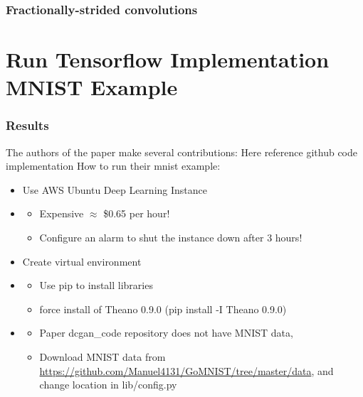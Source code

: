 \documentclass{beamer}
\begin{document}

\begin{frame}
\frametitle{Fractionally-strided convolutions}

\end{frame}



\section{Run Tensorflow Implementation MNIST Example}
\begin{frame}
\frametitle{Results}
The authors of the paper make several contributions:
Here reference github code implementation
How to run their mnist example:
\begin{itemize}
  \item Use AWS Ubuntu Deep Learning Instance
  \item \begin{itemize}
    \item Expensive $\approx$ \$0.65 per hour!
    \item Configure an alarm to shut the instance down after 3 hours!
    \end{itemize}
 \item Create virtual environment
 \item \begin{itemize}
    \item Use pip to install libraries
    \item force install of Theano 0.9.0 (pip install -I Theano 0.9.0)
    \end{itemize} 
 \item \begin{itemize}
    \item Paper dcgan\_code repository does not have MNIST data,
    \item Download MNIST data from \url{https://github.com/Manuel4131/GoMNIST/tree/master/data}, and change location in lib/config.py
    \end{itemize}
 \end{itemize}
\end{frame}

\end{document}
